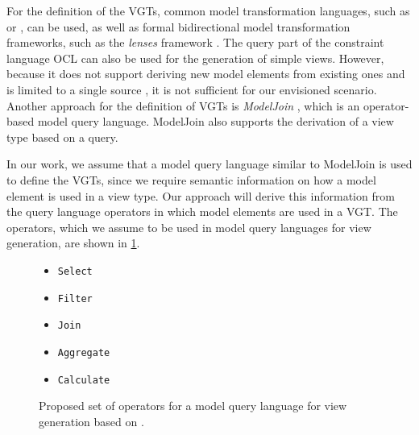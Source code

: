 For the definition of the VGTs, common model transformation languages, such as \cite{omg_qvt} or \cite{eclipse_atl}, can be used, as well as formal bidirectional model transformation frameworks, such as the \emph{lenses} framework \autocite{foster_combinators_2007}.
The query part of the constraint language OCL can also be used for the generation of simple views.
However, because it does not support deriving new model elements from existing ones and is limited to a single source \metamodel, it is not sufficient for our envisioned scenario.
Another approach for the definition of VGTs is \emph{ModelJoin} \autocite{burger_model-join_2016}, which is an operator-based model query language.
ModelJoin also supports the derivation of a view type based on a query.

In our work, we assume that a model query language similar to ModelJoin is used to define the VGTs, since we require semantic information on how a model element is used in a view type.
Our approach will derive this information from the query language operators in which model elements are used in a VGT.
The operators, which we assume to be used in model query languages for view generation, are shown in \cref{fig:model-query-operators}.

\begin{figure}[h]
    \begin{itemize}
        \item \texttt{Select}
        \item \texttt{Filter}
        \item \texttt{Join}
        \item \texttt{Aggregate}
        \item \texttt{Calculate}
    \end{itemize}

    \caption{Proposed set of operators for a model query language for view generation based on \textcite{burger_model-join_2016}.}
    \label{fig:model-query-operators}
\end{figure}

